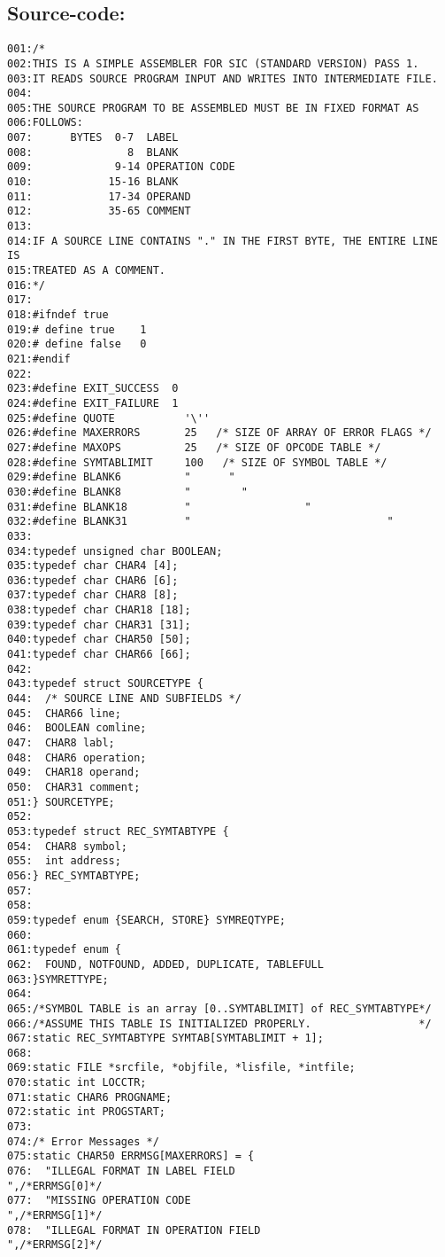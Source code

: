 \subsection*{Source-code:}
\begin{verbatim}
001:/* 
002:THIS IS A SIMPLE ASSEMBLER FOR SIC (STANDARD VERSION) PASS 1. 
003:IT READS SOURCE PROGRAM INPUT AND WRITES INTO INTERMEDIATE FILE.
004:
005:THE SOURCE PROGRAM TO BE ASSEMBLED MUST BE IN FIXED FORMAT AS 
006:FOLLOWS:
007:      BYTES  0-7  LABEL
008:               8  BLANK
009:             9-14 OPERATION CODE
010:            15-16 BLANK
011:            17-34 OPERAND
012:            35-65 COMMENT
013:
014:IF A SOURCE LINE CONTAINS "." IN THE FIRST BYTE, THE ENTIRE LINE IS
015:TREATED AS A COMMENT. 
016:*/
017:
018:#ifndef true
019:# define true    1
020:# define false   0
021:#endif
022:
023:#define EXIT_SUCCESS  0
024:#define EXIT_FAILURE  1
025:#define QUOTE           '\''
026:#define MAXERRORS       25   /* SIZE OF ARRAY OF ERROR FLAGS */
027:#define MAXOPS          25   /* SIZE OF OPCODE TABLE */
028:#define SYMTABLIMIT     100   /* SIZE OF SYMBOL TABLE */
029:#define BLANK6          "      "
030:#define BLANK8          "        "
031:#define BLANK18         "                  "
032:#define BLANK31         "                               "
033:
034:typedef unsigned char BOOLEAN;
035:typedef char CHAR4 [4];
036:typedef char CHAR6 [6];
037:typedef char CHAR8 [8];
038:typedef char CHAR18 [18];
039:typedef char CHAR31 [31];
040:typedef char CHAR50 [50];
041:typedef char CHAR66 [66];
042:
043:typedef struct SOURCETYPE {
044:  /* SOURCE LINE AND SUBFIELDS */
045:  CHAR66 line;
046:  BOOLEAN comline;
047:  CHAR8 labl;
048:  CHAR6 operation;
049:  CHAR18 operand;
050:  CHAR31 comment;
051:} SOURCETYPE;
052:
053:typedef struct REC_SYMTABTYPE {
054:  CHAR8 symbol;
055:  int address;
056:} REC_SYMTABTYPE;
057:
058:
059:typedef enum {SEARCH, STORE} SYMREQTYPE;
060:
061:typedef enum {
062:  FOUND, NOTFOUND, ADDED, DUPLICATE, TABLEFULL
063:}SYMRETTYPE;
064:
065:/*SYMBOL TABLE is an array [0..SYMTABLIMIT] of REC_SYMTABTYPE*/
066:/*ASSUME THIS TABLE IS INITIALIZED PROPERLY.                 */
067:static REC_SYMTABTYPE SYMTAB[SYMTABLIMIT + 1];
068:
069:static FILE *srcfile, *objfile, *lisfile, *intfile;
070:static int LOCCTR;
071:static CHAR6 PROGNAME;
072:static int PROGSTART;
073:
074:/* Error Messages */
075:static CHAR50 ERRMSG[MAXERRORS] = {
076:  "ILLEGAL FORMAT IN LABEL FIELD                     ",/*ERRMSG[0]*/
077:  "MISSING OPERATION CODE                            ",/*ERRMSG[1]*/
078:  "ILLEGAL FORMAT IN OPERATION FIELD                 ",/*ERRMSG[2]*/

\end{verbatim}
